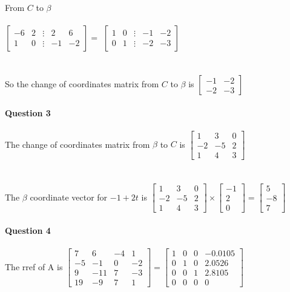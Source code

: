 \documentclass{article}
\begin{document}
\\\\\\
\indent\indent\indent From $C$ to $\beta$
\\\\
\indent\indent\indent$\begin{bmatrix}-6&2&\vdots&2&6\\1&0&\vdots&-1&-2\end{bmatrix} =$
$ \begin{bmatrix}1&0&\vdots&-1&-2\\0&1&\vdots&-2&-3\end{bmatrix}$
\\\\\\
\indent\indent\indent So the change of coordinates matrix from $C$ to $\beta$ is $ \begin{bmatrix}-1&-2\\-2&-3\end{bmatrix}$
\\\\
\noindent\textbf{Question 3}
\\\\
The change of coordinates matrix from $\beta$ to $C$ is $\begin{bmatrix}1&3&0\\-2&-5&2\\1&4&3\end{bmatrix}$
\\\\\\
The $\beta$ coordinate vector for $-1 + 2t$ is $\begin{bmatrix}1&3&0\\-2&-5&2\\1&4&3\end{bmatrix} \times \begin{bmatrix}-1\\2\\0\end{bmatrix} = \begin{bmatrix}5\\-8\\7\end{bmatrix}$ 
\\\\
\noindent\textbf{Question 4}
\\\\
The rref of A is $\begin{bmatrix}7&6&-4&1\\-5&-1&0&-2\\9&-11&7&-3\\19&-9&7&1\end{bmatrix} = \begin{bmatrix}1&0&0&-0.0105\\0&1&0&2.0526\\0&0&1&2.8105\\0&0&0&0\end{bmatrix}$
\end{document}
